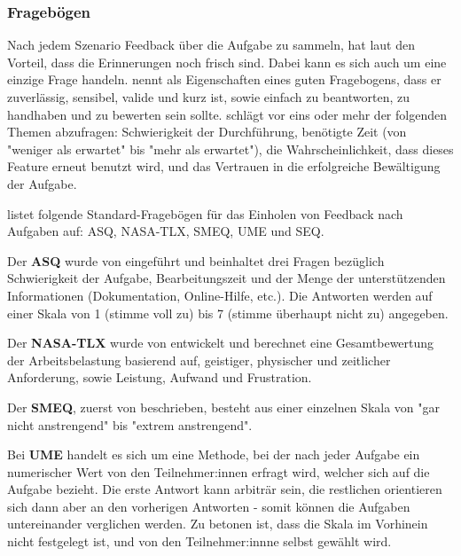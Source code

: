 \subsubsection{Fragebögen}
Nach jedem Szenario Feedback über die Aufgabe zu sammeln, hat laut
\textcite{barnumUsabilityTesting2021} den Vorteil, dass die Erinnerungen noch frisch sind. Dabei
kann es sich auch um eine einzige Frage handeln. \textcite{sauroIfYou2010} nennt als Eigenschaften
eines guten Fragebogens, dass er zuverlässig, sensibel, valide und kurz ist, sowie einfach zu
beantworten, zu handhaben und zu bewerten sein sollte. \textcite{barnumUsabilityTesting2021} schlägt
vor eins oder mehr der folgenden Themen abzufragen: Schwierigkeit der Durchführung, benötigte Zeit
(von "weniger als erwartet" bis "mehr als erwartet"), die Wahrscheinlichkeit, dass dieses Feature
erneut benutzt wird, und das Vertrauen in die erfolgreiche Bewältigung der Aufgabe.

\textcite{sauroIfYou2010} listet folgende Standard-Fragebögen für das Einholen von Feedback nach
Aufgaben auf: \ac{ASQ}, \ac{NASA-TLX}, \ac{SMEQ}, \ac{UME} und \ac{SEQ}. 

Der \textbf{\ac{ASQ}} wurde von \textcite{lewisPsychometricEvaluation1991} eingeführt und beinhaltet
drei Fragen bezüglich Schwierigkeit der Aufgabe, Bearbeitungszeit und der Menge der unterstützenden
Informationen (Dokumentation, Online-Hilfe, etc.). Die Antworten werden auf einer Skala von 1
(stimme voll zu) bis 7 (stimme überhaupt nicht zu) angegeben.

Der \textbf{\ac{NASA-TLX}} wurde von \textcite{hartDevelopmentNASATLX1988} entwickelt und berechnet
eine Gesamtbewertung der Arbeitsbelastung basierend auf, geistiger, physischer und zeitlicher
Anforderung, sowie Leistung, Aufwand und Frustration.
\parencite{nasaNASATLX}

Der \textbf{\ac{SMEQ}}, zuerst von \textcite{zijlstraConstructionScale1985} beschrieben, besteht aus
einer einzelnen Skala von "gar nicht anstrengend" bis "extrem anstrengend".

Bei \textbf{\ac{UME}} handelt es sich um eine Methode, bei der nach jeder Aufgabe ein numerischer
Wert von den Teilnehmer:innen erfragt wird, welcher sich auf die Aufgabe bezieht. Die erste Antwort
kann arbiträr sein, die restlichen orientieren sich dann aber an den vorherigen
Antworten - somit können die Aufgaben untereinander verglichen werden. Zu
betonen ist, dass die Skala im Vorhinein nicht festgelegt ist, und von den
Teilnehmer:innne selbst gewählt wird.
\parencite{mcgeeUsabilityMagnitude2003}

